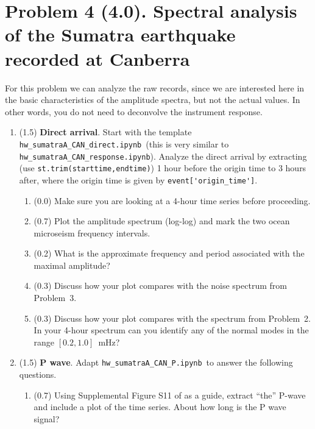 \documentclass[11pt,titlepage,fleqn]{article}
\newcommand{\tfileresponse}{{\tt hw\_sumatraA\_CAN\_response.ipynb}}
\newcommand{\tfileP}{{\tt hw\_sumatraA\_CAN\_P.ipynb}}
\newcommand{\tfiledirect}{{\tt hw\_sumatraA\_CAN\_direct.ipynb}}
\begin{document}
\pagebreak
\section*{Problem 4 (4.0). Spectral analysis of the Sumatra earthquake recorded at Canberra}

For this problem we can analyze the raw records, since we are interested here in the basic characteristics of the amplitude spectra, but not the actual values. In other words, you do not need to deconvolve the instrument response.


\begin{enumerate}
\item (1.5) {\bf Direct arrival}. 
Start with the template \tfiledirect\ (this is very similar to \tfileresponse).
Analyze the direct arrival by extracting (use \verb+st.trim(starttime,endtime)+) 1 hour before the origin time to 3 hours after, where the origin time is given by \verb+event['origin_time']+.

\begin{enumerate}
\item (0.0) Make sure you are looking at a 4-hour time series before proceeding.
\item (0.7) Plot the amplitude spectrum (log-log) and mark the two ocean microseism frequency intervals.
\item (0.2) What is the approximate frequency and period associated with the maximal amplitude?
\item (0.3) Discuss how your plot compares with the noise spectrum from Problem~3.
\item (0.3) Discuss how your plot compares with the spectrum from Problem~2. \\
In your 4-hour spectrum can you identify any of the normal modes in the range $[0.2,1.0]$~mHz?
\end{enumerate}


\item (1.5) {\bf P wave}. Adapt \tfileP\ to answer the following questions.
%
\begin{enumerate}
\item (0.7) Using Supplemental Figure S11 of \citet{Ammon2005} as a guide, extract ``the'' P-wave and include a plot of the time series. About how long is the P wave signal?


\end{enumerate}
\end{enumerate}
\end{document}
